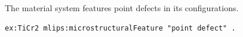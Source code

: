 The material system features point defects in its configurations.
\begin{lstlisting}[language=turtle]
ex:TiCr2 mlips:microstructuralFeature "point defect" .
\end{lstlisting}
